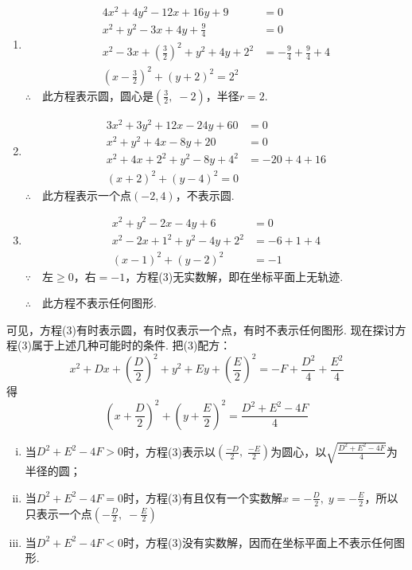 \begin{solution}
\begin{enumerate}[(1)]
    \item \[\begin{split}
        4x^2+4y^2-12x+16y+9&=0\\
x^2+y^2-3x+4y+\frac{9}{4}&=0\\
x^2-3x+\left(\frac{3}{2}\right)^2+y^2+4y+2^2&=-\frac{9}{4}+\frac{9}{4}+4\\
\left(x-\frac{3}{2}\right)^2+(y+2)^2=2^2
    \end{split}\]
$\therefore\quad $此方程表示圆，圆心是$\left(\frac{3}{2},\; -2\right)$，半径$r=2$.

\item \[\begin{split}
    3x^2+3y^2+12x-24y+60&=0\\
    x^2+y^2+4x-8y+20&=0\\
    x^2+4x+2^2+y^2-8y+4^2&=-20+4+16\\
    (x+2)^2+(y-4)^2=0
\end{split}\]
$\therefore\quad $此方程表示一个点$(-2,4)$，不表示圆.

\item \[\begin{split}
    x^2+y^2-2x-4y+6&=0\\
    x^2-2x+1^2+y^2-4y+2^2&=-6+1+4\\
    (x-1)^2+(y-2)^2&=-1
\end{split}\]
$\because\quad $左$\ge 0$，右$=-1$，方程(3)无实数解，即在坐标平面上无轨迹.

$\therefore\quad $此方程不表示任何图形.
\end{enumerate}
\end{solution}

可见，方程(3)有时表示圆，有时仅表示一个点，有时不表示任何图形. 现在探讨方程(3)属于上述几种可能时的条件. 把(3)配方：
\[x^2+Dx+\left(\frac{D}{2}\right)^2+y^2+Ey+\left(\frac{E}{2}\right)^2=-F+\frac{D^2}{4}+\frac{E^2}{4}\]
得
\[\left(x+\frac{D}{2}\right)^2+\left(y+\frac{E}{2}\right)^2=\frac{D^2+E^2-4F}{4}\]
\begin{enumerate}[(i)]
    \item 当$D^2+E^2-4F>0$时，方程(3)表示以$\left(\frac{-D}{2},\; \frac{-E}{2}\right)$为圆心，以$\sqrt{\frac{D^2+E^2-4F}{4}}$为半径的圆；
    \item 当$D^2+E^2-4F=0$时，方程(3)有且仅有一个实数解$x=-\frac{D}{2},\; y=-\frac{E}{2}$，所以只表示一个点$\left(-\frac{D}{2},\; -\frac{E}{2}\right)$
    \item 当$D^2+E^2-4F<0$时，方程(3)没有实数解，因而在坐标平面上不表示任何图形.
\end{enumerate}

